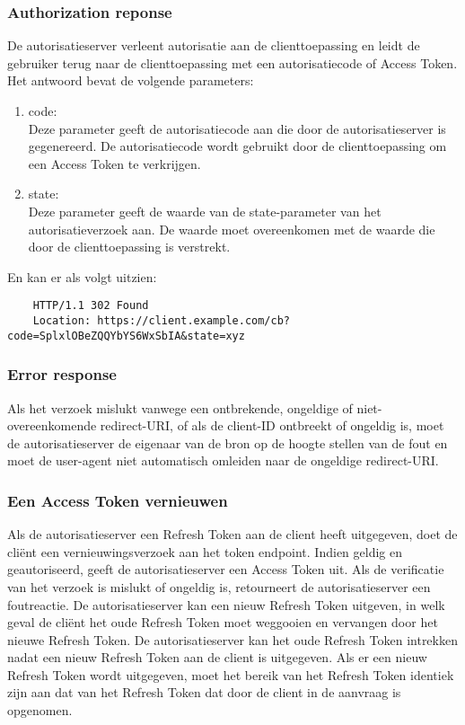 \subsubsection{Authorization reponse}%
\label{subsubsec:authorization-reponse}
De autorisatieserver verleent autorisatie aan de clienttoepassing en leidt de gebruiker terug naar de clienttoepassing met een autorisatiecode of Access Token. Het antwoord bevat de volgende parameters:
\begin{enumerate}[label=\textbf{-}]
    \item code: \\
    Deze parameter geeft de autorisatiecode aan die door de autorisatieserver is gegenereerd. De autorisatiecode wordt gebruikt door de clienttoepassing om een Access Token te verkrijgen.
  
    \item state: \\
    Deze parameter geeft de waarde van de state-parameter van het autorisatieverzoek aan. De waarde moet overeenkomen met de waarde die door de clienttoepassing is verstrekt.
  \end{enumerate}
  En kan er als volgt uitzien:
  \begin{verbatim}
    HTTP/1.1 302 Found
    Location: https://client.example.com/cb?code=SplxlOBeZQQYbYS6WxSbIA&state=xyz
  \end{verbatim}

  \subsubsection{Error response}%
  \label{subsubsec:error-response}
  Als het verzoek mislukt vanwege een ontbrekende, ongeldige of niet-overeenkomende redirect-URI, of als de client-ID ontbreekt of ongeldig is, moet de autorisatieserver de eigenaar van de bron op de hoogte stellen van de fout en moet de user-agent niet automatisch omleiden naar de ongeldige redirect-URI.
  
  \subsubsection{Een Access Token vernieuwen}%
  \label{subsubsec:een-access-token-vernieuwen}
  Als de autorisatieserver een Refresh Token aan de client heeft uitgegeven, doet de cliënt een vernieuwingsverzoek aan het token endpoint.
  Indien geldig en geautoriseerd, geeft de autorisatieserver een Access Token uit. Als de verificatie van het verzoek is mislukt of ongeldig is, retourneert de autorisatieserver een foutreactie.
  De autorisatieserver kan een nieuw Refresh Token uitgeven, in welk geval de cliënt het oude Refresh Token moet weggooien en vervangen door het nieuwe Refresh Token. De autorisatieserver kan het oude Refresh Token intrekken nadat een nieuw Refresh Token aan de client is uitgegeven. Als er een nieuw Refresh Token wordt uitgegeven, moet het bereik van het Refresh Token identiek zijn aan dat van het Refresh Token dat door de client in de aanvraag is opgenomen.
  
